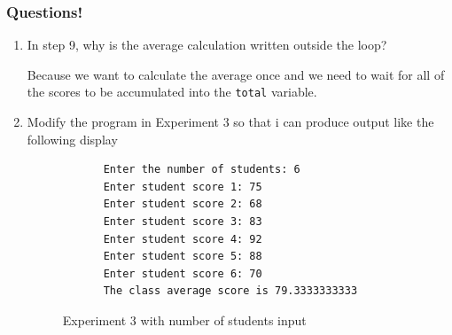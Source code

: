 \documentclass[12pt,titlepage]{article}
\begin{document}
\subsubsection*{Questions!}
\begin{enumerate}
    \item {
        In step 9, why is the average calculation written outside the loop?

        Because we want to calculate the average once and we need to wait for all of the scores to be accumulated into the \texttt{total} variable.
    }
    \pagebreak
    \item {
        Modify the program in Experiment 3 so that i can produce output like the following display

        \begin{verbatim}
            Enter the number of students: 6
            Enter student score 1: 75
            Enter student score 2: 68
            Enter student score 3: 83
            Enter student score 4: 92
            Enter student score 5: 88
            Enter student score 6: 70
            The class average score is 79.3333333333
        \end{verbatim}

        \begin{figure}[h]
            \centering
            \caption{Experiment 3 with number of students input}
        \end{figure}
    }
\end{enumerate}

\pagebreak
\end{document}

